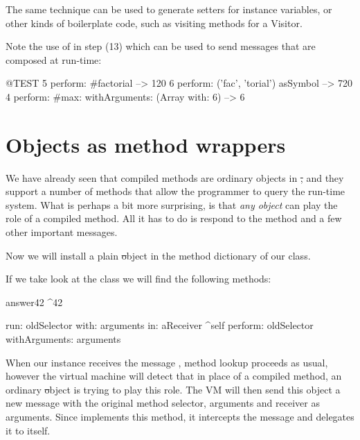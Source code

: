 \documentclass[a4paper,10pt,twoside]{book}
\begin{document}
The same technique can be used to generate setters for instance variables, or other kinds of boilerplate code, such as visiting methods for a Visitor.

Note the use of  in step (13) which can be used to send messages that are composed at run-time:
\begin{code}{@TEST}
5 perform: #factorial                                             --> 120
6 perform: ('fac', 'torial') asSymbol                       --> 720
4 perform: #max: withArguments: (Array with: 6) --> 6
\end{code}

\section{Objects as method wrappers}

We have already seen that compiled methods are ordinary objects in \st, and they support a number of methods that allow the programmer to query the run-time system.
What is perhaps a bit more surprising, is that \emph{any object} can play the role of a compiled method. All it has to do is respond to the method  and a few other important messages.


Now we will install a plain \st object in the method dictionary of our  class.


If we take look at the class  we will find the following methods:
\begin{code}{}
answer42
        ^42

run: oldSelector with: arguments in: aReceiver
        ^self perform: oldSelector withArguments: arguments
\end{code}

When our  instance receives the message , method lookup proceeds as usual, however the virtual machine will detect that in place of a compiled method, an ordinary \st object is trying to play this role.
The VM will then send this object a new message  with the original method selector, arguments and receiver as arguments.
Since  implements this method, it intercepts the message and delegates it to itself.
\end{document}
